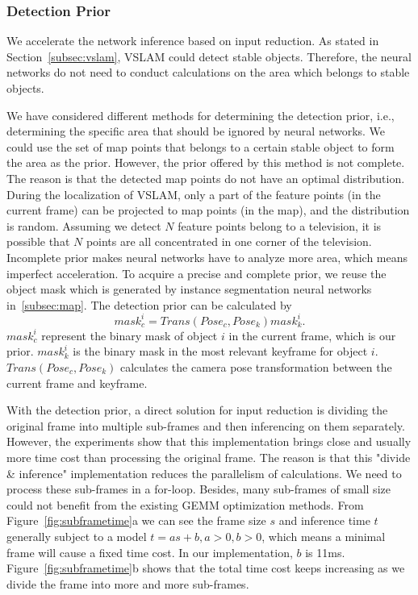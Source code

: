 \subsubsection{\textbf{Detection Prior}}
We accelerate the network inference based on input reduction.
As stated in Section~\ref{subsec:vslam}, VSLAM could detect stable objects. Therefore, the neural networks do not need to  
conduct calculations on the area which belongs to stable objects.

We have considered different methods for determining the detection prior, i.e., determining the specific area that should be ignored by neural networks. 
We could use the set of map points that belongs to a certain stable object to form the area as the prior.
However, the prior offered by this method is not complete.
The reason is that the detected map points do not have an optimal 
distribution.
During the localization of VSLAM, only a part of the feature points
(in the current frame) can be projected to map points (in the map),
and the distribution is random.
Assuming we detect $N$ feature points belong to a television, it is possible that $N$ points are all concentrated in one corner of the television.
Incomplete prior makes neural networks have to analyze more area,
which means imperfect acceleration.
To acquire a precise and complete prior, we reuse the object mask
which is generated by instance segmentation neural networks in~\ref{subsec:map}. The detection prior can be 
calculated by 
\begin{equation}\label{equ:mask}
mask_c^i = Trans(Pose_c,Pose_k)mask_k^i.
\end{equation} 
$mask_c^i$ represent the binary mask of object $i$ in the current frame, which is our prior. $mask_k^i$ is the binary mask in the most relevant keyframe for object $i$. $Trans(Pose_c,Pose_k)$ calculates the camera pose transformation between the current frame and keyframe.

With the detection prior, a direct solution for input reduction is 
dividing the original frame into multiple sub-frames and then inferencing on them separately.
However, the experiments show that this implementation brings close and usually more time cost than processing the original frame. 
The reason is that this "divide \& inference" implementation reduces the parallelism of calculations. We need to process these sub-frames in a for-loop. Besides, many sub-frames of small size could not benefit from the existing GEMM optimization methods.
From Figure~\ref{fig:subframetime}a we can see the frame size $s$ and inference time $t$ generally subject to a model $t = as + b, a>0,b >0$, which means a minimal frame will cause a fixed time cost. In our implementation, $b$ is 11ms.
Figure~\ref{fig:subframetime}b  shows that the total time cost keeps increasing as we divide the frame into more and more sub-frames.

